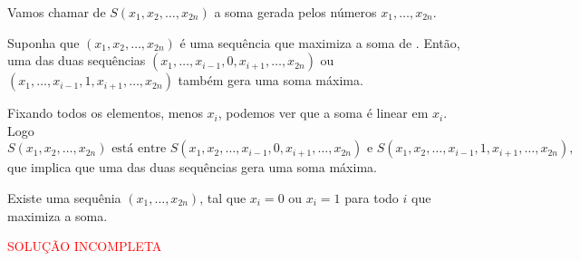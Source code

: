 Vamos chamar de $S(x_1, x_2, \dots, x_{2n})$ a soma gerada pelos números $x_1, \dots, x_{2n}$.

\begin{lem*}
	Suponha que $(x_1, x_2, \dots, x_{2n})$ é uma sequência que maximiza a soma de . Então, uma das duas sequências $(x_1, \dots, x_{i-1}, 0, x_{i+1}, \dots, x_{2n})$ ou $(x_1, \dots, x_{i-1}, 1, x_{i+1}, \dots, x_{2n})$ também gera uma soma máxima.
\end{lem*}

\begin{dem*}
	Fixando todos os elementos, menos $x_i$, podemos ver que a soma é linear em $x_i$. Logo
	\begin{equation*}
		S(x_1, x_2, \dots, x_{2n}) \text{ está entre } S(x_1, x_2, \dots, x_{i-1}, 0, x_{i+1}, \dots, x_{2n}) \text{ e } S(x_1, x_2, \dots, x_{i-1}, 1, x_{i+1}, \dots, x_{2n}),
	\end{equation*}
	que implica que uma das duas sequências gera uma soma máxima.
\end{dem*}

\begin{cor*}
	Existe uma sequênia $(x_1, \dots, x_{2n})$, tal que $x_i = 0$ ou $x_i = 1$ para todo $i$ que maximiza a soma.
\end{cor*}

\textcolor{red}{SOLUÇÃO INCOMPLETA}
